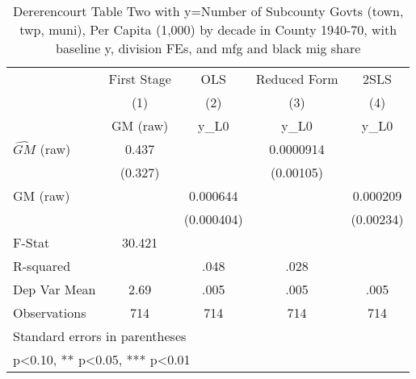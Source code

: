 \begin{table}[htbp]\centering
\def\sym#1{\ifmmode^{#1}\else\(^{#1}\)\fi}
\caption{Dererencourt Table Two with y=Number of Subcounty Govts (town, twp, muni), Per Capita (1,000) by decade in County 1940-70, with baseline y, division FEs, and mfg and black mig share}
\begin{tabular}{l*{4}{c}}
\toprule
                    & First Stage   &         OLS   &Reduced Form   &        2SLS   \\
                    &\multicolumn{1}{c}{(1)}&\multicolumn{1}{c}{(2)}&\multicolumn{1}{c}{(3)}&\multicolumn{1}{c}{(4)}\\
                    &\multicolumn{1}{c}{GM  (raw)}&\multicolumn{1}{c}{y\_L0}&\multicolumn{1}{c}{y\_L0}&\multicolumn{1}{c}{y\_L0}\\
\midrule
$\hat{GM}$ (raw)    &       0.437   &               &   0.0000914   &               \\
                    &     (0.327)   &               &   (0.00105)   &               \\
\addlinespace
GM  (raw)           &               &    0.000644   &               &    0.000209   \\
                    &               &  (0.000404)   &               &   (0.00234)   \\
\midrule
F-Stat              &      30.421   &               &               &               \\
R-squared           &               &        .048   &        .028   &               \\
Dep Var Mean        &        2.69   &        .005   &        .005   &        .005   \\
Observations        &         714   &         714   &         714   &         714   \\
\bottomrule
\multicolumn{5}{l}{\footnotesize Standard errors in parentheses}\\
\multicolumn{5}{l}{\footnotesize * p<0.10, ** p<0.05, *** p<0.01}\\
\end{tabular}
\end{table}

